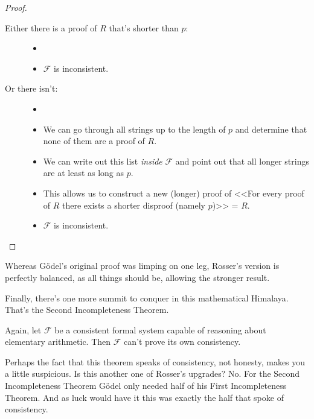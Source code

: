 \documentclass{article}
\theoremstyle{customstyle}
\newcommand{\F}{\ensuremath{\mathcal{F}}}
\begin{document}
\begin{proof}
\begin{description}
\begin{description}
\item[Either there is a proof of $R$ that's shorter than $p$:]
\begin{itemize}
\item[]
\item $\F$ is inconsistent. \lightning
\end{itemize}
\item[Or there isn't:]
\begin{itemize}
\item[]
\item We can go through all strings up to the length of $p$ and determine that none of them are a proof of $R$.
\item We can write out this list \textit{inside} $\F$ and point out that all longer strings are at least as long as $p$.
\item This allows us to construct a new (longer) proof of <<For every proof of $R$ there exists a shorter disproof (namely $p$)>> = $R$.
\item $\F$ is inconsistent. \lightning\qedhere
\end{itemize}
\end{description}
\end{description}
\end{proof}

Whereas Gödel's original proof was limping on one leg, Rosser's version is perfectly balanced, as all things should be, allowing the stronger result.

Finally, there's one more summit to conquer in this mathematical Himalaya. That's the Second Incompleteness Theorem.

\begin{theorem}
Again, let $\F$ be a consistent formal system capable of reasoning about elementary arithmetic. Then $\F$ can't prove its own consistency.
\end{theorem}

Perhaps the fact that this theorem speaks of consistency, not honesty, makes you a little suspicious. Is this another one of Rosser's upgrades? No. For the Second Incompleteness Theorem Gödel only needed half of his First Incompleteness Theorem. And as luck would have it this was exactly the half that spoke of consistency.
\end{document}
